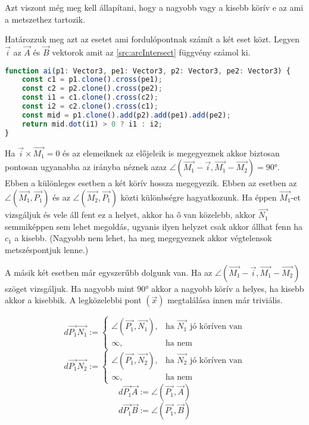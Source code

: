 Azt viszont még meg kell állapítani, hogy a nagyobb vagy a kisebb körív e az ami a metszethez tartozik.

Határozzuk meg azt az esetet ami fordulópontnak számít a két eset közt. Legyen $\overrightarrow{i}$ az $\overrightarrow{A}$ és $\overrightarrow{B}$ vektorok amit az \ref{src:arcIntersect} függvény számol ki.

\begin{lstlisting}[language={JavaScript}]
function ai(p1: Vector3, pe1: Vector3, p2: Vector3, pe2: Vector3) {
	const c1 = p1.clone().cross(pe1);
	const c2 = p2.clone().cross(pe2);
	const i1 = c1.clone().cross(c2);
	const i2 = c2.clone().cross(c1);
	const mid = p1.clone().add(p2).add(pe1).add(pe2);
	return mid.dot(i1) > 0 ? i1 : i2;
}
\end{lstlisting}

Ha $\overrightarrow{i} × \overrightarrow{M_1} = 0$ és az elemeiknek az előjeleik is megegyeznek akkor biztosan pontosan ugyanabba az irányba néznek azaz $\angle (\overrightarrow{M_1} - \overrightarrow{i}, \overrightarrow{M_1} - \overrightarrow{M_2}) = 90°$. Ebben a különleges esetben a két körív hossza megegyezik. Ebben az esetben az $\angle (\overrightarrow{M_1}, \overrightarrow{P_1})$ és az $\angle (\overrightarrow{M_2}, \overrightarrow{P_1})$ közti különbségre hagyatkozunk. Ha éppen $\overrightarrow{M_1}$-et vizsgáljuk és vele áll fent ez a helyet, akkor ha ő van közelebb, akkor $\overrightarrow{N_1}$ semmiképpen sem lehet megoldás, ugyanis ilyen helyzet csak akkor állhat fenn ha $c_1$ a kisebb. (Nagyobb nem lehet, ha meg megegyeznek akkor végtelensok metszéspontjuk lenne.)

A másik két esetben már egyszerűbb dolgunk van. Ha az $\angle(\overrightarrow{M_1} - \overrightarrow{i}, \overrightarrow{M_1} - \overrightarrow{M_2})$ szöget vizsgáljuk. Ha nagyobb mint $90°$ akkor a nagyobb körív a helyes, ha kisebb akkor a kisebbik. A legközelebbi pont $(\overrightarrow{x})$ megtalálása innen már triviális.

\[
	d\overrightarrow{P_1}\overrightarrow{N_1} :=
\begin{cases}
    \angle(\overrightarrow{P_1}, \overrightarrow{N_1}),& \text{ha }  \overrightarrow{N_1} \text{ jó köríven van} \\
    \infty,              & \text{ha nem}
\end{cases}
\]
\[
	d\overrightarrow{P_1}\overrightarrow{N_2} :=
\begin{cases}
    \angle(\overrightarrow{P_1}, \overrightarrow{N_2}),& \text{ha }  \overrightarrow{N_2} \text{ jó köríven van} \\
    \infty,              & \text{ha nem}
\end{cases}
\]
$$d\overrightarrow{P_1}\overrightarrow{A} :=  \angle(\overrightarrow{P_1}, \overrightarrow{A})$$
$$d\overrightarrow{P_1}\overrightarrow{B} :=  \angle(\overrightarrow{P_1}, \overrightarrow{B})$$

